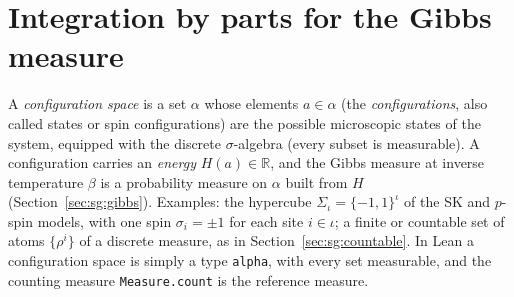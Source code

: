 \section{Integration by parts for the Gibbs measure}\label{sec:sg:ibp}

\begin{definition}\label{def:sg:configspace}
A \emph{configuration space} is a set $\alpha$ whose elements $a\in\alpha$ (the \emph{configurations}, also called states or
spin configurations) are the possible microscopic states of the system, equipped with the discrete $\sigma$-algebra (every
subset is measurable). A configuration carries an \emph{energy} $H(a)\in\mathbb R$, and the Gibbs measure at inverse temperature
$\beta$ is a probability measure on $\alpha$ built from $H$ (Section~\ref{sec:sg:gibbs}). Examples: the hypercube
$\Sigma_\iota=\{-1,1\}^\iota$ of the SK and $p$-spin models, with one spin $\sigma_i=\pm1$ for each site $i\in\iota$; a finite or
countable set of atoms $\{\rho^i\}$ of a discrete measure, as in Section~\ref{sec:sg:countable}. In Lean a configuration space is simply a type \texttt{alpha}, with every set measurable, and the counting measure
\texttt{Measure.count} is the reference measure.
\end{definition}

